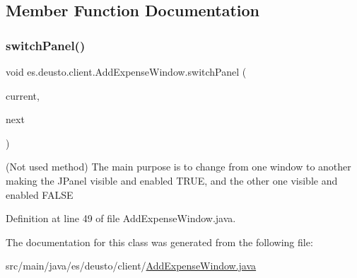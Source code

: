\subsection{Member Function Documentation}
\mbox{\label{classes_1_1deusto_1_1client_1_1_add_expense_window_a6240f4fbc81e74662e2b811e20768e9a}} 
\subsubsection{\texorpdfstring{switch\+Panel()}{switchPanel()}}
{\footnotesize\ttfamily void es.\+deusto.\+client.\+Add\+Expense\+Window.\+switch\+Panel (\begin{DoxyParamCaption}\item[{J\+Panel}]{current,  }\item[{J\+Panel}]{next }\end{DoxyParamCaption})}

(Not used method) The main purpose is to change from one window to another making the J\+Panel visible and enabled T\+R\+UE, and the other one visible and enabled F\+A\+L\+SE 

Definition at line 49 of file Add\+Expense\+Window.\+java.



The documentation for this class was generated from the following file\+:\begin{DoxyCompactItemize}
\item 
src/main/java/es/deusto/client/\hyperlink{_add_expense_window_8java}{Add\+Expense\+Window.\+java}\end{DoxyCompactItemize}

